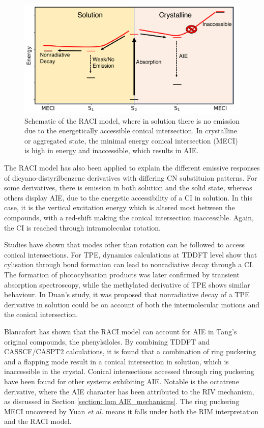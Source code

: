 \begin{figure}[t]
\centering
  \includegraphics[width=0.9\linewidth]{1Intro/RACI_Model.pdf}
  \caption[Schematic of the RACI Model]{Schematic of the RACI model, where in solution there is no emission due to the energetically accessible conical intersection. In crystalline or aggregated state, the minimal energy conical intersection (MECI) is high in energy and inaccessible, which results in AIE.}
  \label{figure: RACI}
\end{figure}

The RACI model has also been applied to explain the different emissive responses of dicyano-distyrilbenzene derivatives with differing CN substituion patterns.\cite{Shi2017} For some derivatives, there is emission in both solution and the solid state, whereas others display AIE, due to the energetic accessibility of a CI in solution. In this case, it is the vertical excitation energy which is altered most between the compounds, with a red-shift making the conical intersection inaccessible. Again, the CI is reached through intramolecular rotation.

Studies have shown that modes other than rotation can be followed to access conical intersections. For \ac{TPE}, dynamics calculations at TDDFT level show that cylisation through bond formation can lead to nonradiative decay through a CI.\cite{Prlj2016} The formation of photocylisation products was later confirmed by transient absorption spectroscopy, while the methylated derivative of \ac{TPE} shows similar behaviour.\cite{Cai2018a,Gao2017} In Duan's study, it was proposed that nonradiative decay of a TPE derivative in solution could be on account of both the intermolecular motions and the conical intersection.\cite{Duan2017} 

Blancafort has shown that the RACI model can account for AIE in Tang's original compounds, the phenylsiloles.\cite{Peng2016} By combining TDDFT and CASSCF/CASPT2 calculations, it is found that a combination of ring puckering and a flapping mode result in a conical intersection in solution, which is inaccessible in the crystal. Conical intersections accessed through ring puckering have been found for other systems exhibiting AIE.\cite{Sasaki2016} Notable is the octatrene derivative, where the AIE character has been attributed to the \ac{RIV} mechanism, as discussed in Section \ref{section: lom AIE_mechanisms}. \cite{Nishiuchi2013} The ring puckering \ac{MECI} uncovered by Yuan \textit{et al.} means it falls under both the \ac{RIM} interpretation and the \ac{RACI} model.\cite{Yuan2013}

